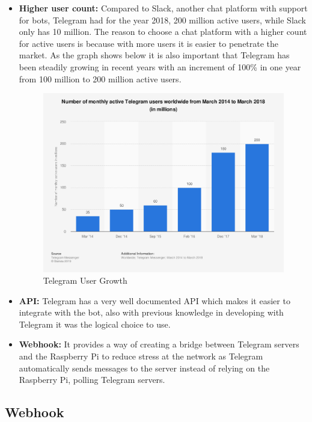 \begin{itemize}
	\item{\textbf{Higher user count:} Compared to Slack, another chat platform with support for bots, Telegram had for the year 2018, 200 million active users, while Slack only has 10 million. The reason to choose a chat platform with a higher count for active users is because with more users it is easier to penetrate the market. As the graph shows below it is also important that Telegram has been steadily growing in recent years with an increment of 100\% in one year from 100 million to 200 million active users.
	\begin{center}
		\begin{figure}[h!]
			\centering
			\includegraphics[scale=0.4]{./images/4-tele}
			\caption{Telegram User Growth}
			\label{4_tele}
		\end{figure}
	\end{center}
	}
	\item{\textbf{API:} Telegram has a very well documented API which makes it easier to integrate with the bot, also with previous knowledge in developing with Telegram it was the logical choice to use.}
	\item{\textbf{Webhook:} It provides a way of creating a bridge between Telegram servers and the Raspberry Pi to reduce stress at the network as Telegram automatically sends messages to the server instead of relying on the Raspberry Pi, polling Telegram servers.}
\end{itemize} 

\subsection{Webhook}\label{sec:chap4_ori_webhook}

